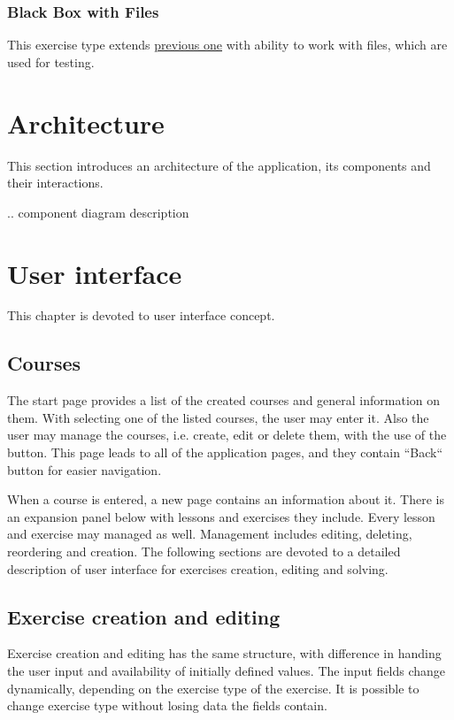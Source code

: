             \subsubsection{Black Box with Files}
            This exercise type extends \hyperref[subsubsec:blackbox]{previous one} with ability to work with files, which are used for testing.


    \section{Architecture}
    This section introduces an architecture of the application, its components and their interactions.

    .. component diagram description

    \section{User interface}
    This chapter is devoted to user interface concept.
    
        \subsection{Courses}
        The start page provides a list of the created courses and general information on them. With selecting one of the listed courses, the user may enter it. Also the user may manage the courses, i.e. create, edit or delete them, with the use of the button. This page leads to all of the application pages, and they contain ``Back`` button for easier navigation.
    
        When a course is entered, a new page contains an information about it. There is an expansion panel below with lessons and exercises they include. Every lesson and exercise may managed as well. Management includes editing, deleting, reordering and creation. The following sections are devoted to a detailed description of user interface for exercises creation, editing and solving.
    
        \subsection{Exercise creation and editing}
        Exercise creation and editing has the same structure, with difference in handing the user input and availability of initially defined values. The input fields change dynamically, depending on the exercise type of the exercise. It is possible to change exercise type without losing data the fields contain.
        
